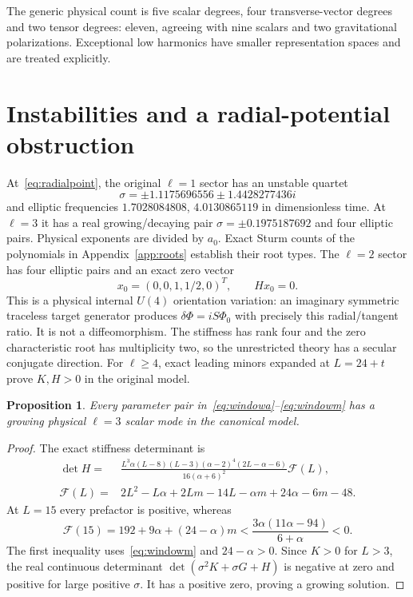 \documentclass[11pt]{article}
\newtheorem{proposition}{Proposition}
\numberwithin{equation}{section}
\begin{document}
The generic physical count is five scalar degrees, four transverse-vector degrees and two tensor degrees: eleven, agreeing with nine scalars and two gravitational polarizations.
Exceptional low harmonics have smaller representation spaces and are treated explicitly.

\section{Instabilities and a radial-potential obstruction}
\label{sec:obstruction}

At~\eqref{eq:radialpoint}, the original $\ell=1$ sector has an unstable quartet
\begin{equation}
 \sigma=\pm1.1175696556\pm1.4428277436i
\end{equation}
and elliptic frequencies $1.7028084808$, $4.0130865119$ in dimensionless time.
At $\ell=3$ it has a real growing/decaying pair $\sigma=\pm0.1975187692$ and four elliptic pairs.
Physical exponents are divided by $a_0$.
Exact Sturm counts of the polynomials in Appendix~\ref{app:roots} establish their root types.
The $\ell=2$ sector has four elliptic pairs and an exact zero vector
\begin{equation}
 x_0=(0,0,1,1/2,0)^T,\qquad Hx_0=0.
\end{equation}
This is a physical internal $U(4)$ orientation variation: an imaginary symmetric traceless target generator produces $\delta\Phi=iS\Phi_0$ with precisely this radial/tangent ratio.
It is not a diffeomorphism.
The stiffness has rank four and the zero characteristic root has multiplicity two, so the unrestricted theory has a secular conjugate direction.
For $\ell\ge4$, exact leading minors expanded at $L=24+t$ prove $K,H>0$ in the original model.

\begin{proposition}
Every parameter pair in~\eqref{eq:windowa}--\eqref{eq:windowm} has a growing physical $\ell=3$ scalar mode in the canonical model.
\end{proposition}
\begin{proof}
The exact stiffness determinant is
\begin{align}
 \det H={}&\frac{L^3\alpha(L-8)(L-3)(\alpha-2)^4(2L-\alpha-6)}{16(\alpha+6)^2}\mathcal F(L),\\
 \mathcal F(L)={}&2L^2-L\alpha+2Lm-14L-\alpha m+24\alpha-6m-48.
\end{align}
At $L=15$ every prefactor is positive, whereas
\begin{equation}
 \mathcal F(15)=192+9\alpha+(24-\alpha)m
 <\frac{3\alpha(11\alpha-94)}{6+\alpha}<0.
\end{equation}
The first inequality uses~\eqref{eq:windowm} and $24-\alpha>0$.
Since $K>0$ for $L>3$, the real continuous determinant $\det(\sigma^2K+\sigma G+H)$ is negative at zero and positive for large positive $\sigma$.
It has a positive zero, proving a growing solution.
\end{proof}
\end{document}
